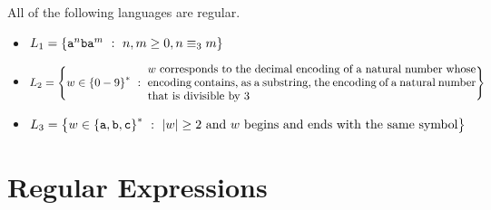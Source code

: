 \documentclass[twoside,letterpaper,openany]{book}
\begin{document}
\begin{stmt}\label{stmt:nfas}
All of the following languages are regular.
\begin{itemize}
\item $L_1 = \left\lbrace {\texttt{a}}^n{\texttt{b}}{\texttt{a}}^m\ :\ n, m \geq 0, n \equiv_3 m \right\rbrace$
\item $L_2 = \setbuild{w\in\setstar{\setdef{0-9}}}{
\parbox{4in}{$w$~corresponds to the decimal encoding of a natural number whose encoding contains, as a substring,
			the encoding of a natural number that is divisible by 3}
			}$
\item $L_3 = \setbuild{w\in\setstar{\setdef{\charA, \charB, \texttt{c}}}}{|w| \geq 2\ \textrm{and}\ w\ \textrm{begins and ends with the same symbol}}$


\end{itemize}
\end{stmt}




\section{Regular Expressions}\label{sec:regexp}
\end{document}

